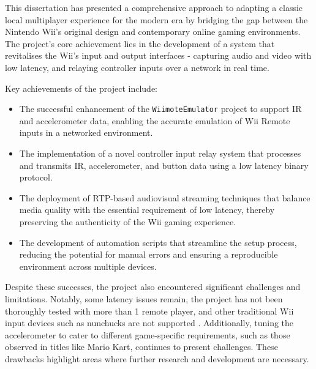 \label{chapter:conclusion}

This dissertation has presented a comprehensive approach to adapting a classic local multiplayer experience for the modern era by bridging the gap between the Nintendo Wii’s original design and contemporary online gaming environments. The project’s core achievement lies in the development of a system that revitalises the Wii’s input and output interfaces - capturing audio and video with low latency, and relaying controller inputs over a network in real time.

Key achievements of the project include:
\begin{itemize}
    \item The successful enhancement of the \texttt{WiimoteEmulator} project to support IR and accelerometer data, enabling the accurate emulation of Wii Remote inputs in a networked environment.
    \item The implementation of a novel controller input relay system that processes and transmits IR, accelerometer, and button data using a low latency binary protocol.
    \item The deployment of RTP-based audiovisual streaming techniques that balance media quality with the essential requirement of low latency, thereby preserving the authenticity of the Wii gaming experience.
    \item The development of automation scripts that streamline the setup process, reducing the potential for manual errors and ensuring a reproducible environment across multiple devices.
\end{itemize}

Despite these successes, the project also encountered significant challenges and limitations. Notably, some latency issues remain, the project has not been thoroughly tested with more than 1 remote player, and other traditional Wii input devices such as nunchucks are not supported . Additionally, tuning the accelerometer to cater to different game-specific requirements, such as those observed in titles like Mario Kart, continues to present challenges. These drawbacks highlight areas where further research and development are necessary.


